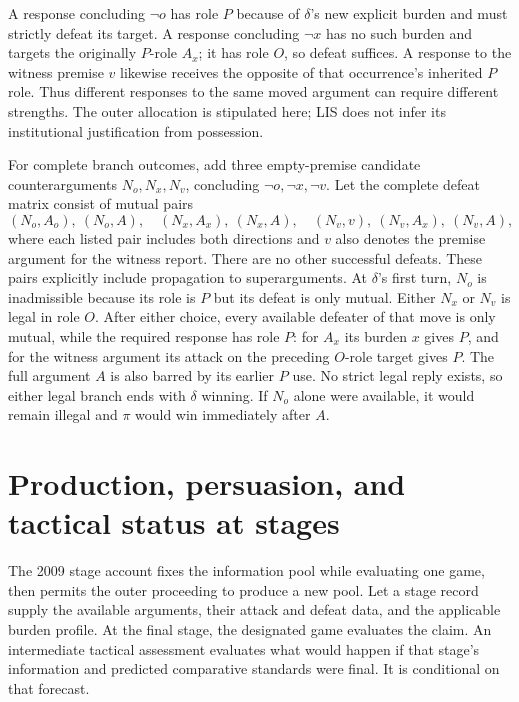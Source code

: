 A response concluding \(\neg o\) has role \(P\) because of
\(\delta\)'s new explicit burden and must strictly defeat its target.
A response concluding \(\neg x\) has no such burden and targets
the originally \(P\)-role \(A_x\); it has role \(O\), so defeat
suffices. A response to the witness premise \(v\) likewise receives
the opposite of that occurrence's inherited \(P\) role.
Thus different responses to the same moved argument can require
different strengths. The outer allocation is stipulated here;
LIS does not infer its institutional justification from possession.

For complete branch outcomes, add three empty-premise candidate
counterarguments \(N_o,N_x,N_v\), concluding \(\neg o,\neg x,\neg v\).
Let the complete defeat matrix consist of mutual pairs
\[
(N_o,A_o),\ (N_o,A),\quad
(N_x,A_x),\ (N_x,A),\quad
(N_v,v),\ (N_v,A_x),\ (N_v,A),
\]
where each listed pair includes both directions and \(v\)
also denotes the premise argument for the witness report.
There are no other successful defeats.
These pairs explicitly include propagation to superarguments.
At \(\delta\)'s first turn, \(N_o\) is inadmissible because its
role is \(P\) but its defeat is only mutual.
Either \(N_x\) or \(N_v\) is legal in role \(O\).
After either choice, every available defeater of that move is
only mutual, while the required response has role \(P\):
for \(A_x\) its burden \(x\) gives \(P\), and for the witness
argument its attack on the preceding \(O\)-role target gives \(P\).
The full argument \(A\) is also barred by its earlier \(P\) use.
No strict legal reply exists, so either legal branch ends with
\(\delta\) winning. If \(N_o\) alone were available, it would
remain illegal and \(\pi\) would win immediately after \(A\).

\section{Production, persuasion, and tactical status at stages}
\label{sec:p18-lis-stage-burdens}

The 2009 stage account fixes the information pool while evaluating
one game, then permits the outer proceeding to produce a new pool.
Let a stage record supply the available arguments, their attack
and defeat data, and the applicable burden profile.
At the final stage, the designated game evaluates the claim.
An intermediate tactical assessment evaluates what would happen
if that stage's information and predicted comparative standards
were final. It is conditional on that forecast.

